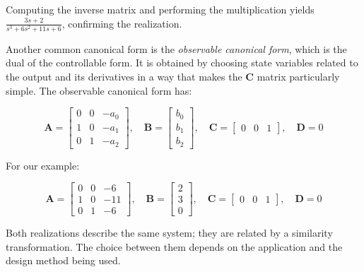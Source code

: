 Computing the inverse matrix and performing the multiplication yields $\frac{3s+2}{s^3+6s^2+11s+6}$, confirming the realization.

Another common canonical form is the \emph{observable canonical form}, which is the dual of the controllable form. It is obtained by choosing state variables related to the output and its derivatives in a way that makes the $\mathbf{C}$ matrix particularly simple. The observable canonical form has:

\begin{equation}
\mathbf{A} = \begin{bmatrix}
0 & 0 & -a_0 \\
1 & 0 & -a_1 \\
0 & 1 & -a_2
\end{bmatrix}, \quad
\mathbf{B} = \begin{bmatrix} b_0 \\ b_1 \\ b_2 \end{bmatrix}, \quad
\mathbf{C} = \begin{bmatrix} 0 & 0 & 1 \end{bmatrix}, \quad
\mathbf{D} = 0
\end{equation}

For our example:

\begin{equation}
\mathbf{A} = \begin{bmatrix}
0 & 0 & -6 \\
1 & 0 & -11 \\
0 & 1 & -6
\end{bmatrix}, \quad
\mathbf{B} = \begin{bmatrix} 2 \\ 3 \\ 0 \end{bmatrix}, \quad
\mathbf{C} = \begin{bmatrix} 0 & 0 & 1 \end{bmatrix}, \quad
\mathbf{D} = 0
\end{equation}

Both realizations describe the same system; they are related by a similarity transformation. The choice between them depends on the application and the design method being used.

